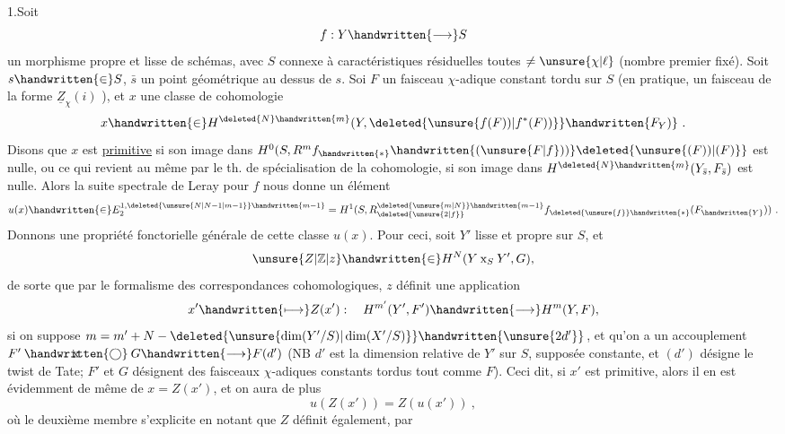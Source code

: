 
1.\quad Soit
\[
f:Y\handwritten{\longrightarrow}S
\]
un morphisme propre et lisse de schémas, avec $S$  connexe à caractéristiques résiduelles toutes $\ne\unsure{\chi|\ell}$ (nombre premier fixé). Soit $s\handwritten{\in}S$, $\bar s$ un point géométrique au dessus de $s$. Soi $F$ un faisceau $\chi$-adique constant tordu sur $S$ (en pratique, un faisceau de la forme $\underline{Z}_{\chi}(i)$ ), et $x$ une classe de cohomologie
\[
x\handwritten{\in}H^{\deleted{N}\handwritten{m}}(Y,\deleted{\unsure{f(F))|f^*(F))}}\handwritten{F_Y)}\ .
\]
Disons que $x$ est \uline{primitive} si son image dans $H^0(S,R^m f_{\handwritten{*}}\handwritten{(\unsure{F|f}))}\deleted{\unsure{(F))|(F)}}$ est nulle, ou ce qui revient au même par le th. de spécialisation de la cohomologie, si son image dans $H^{\deleted{N}\handwritten{m}}(Y_{\bar s},F_{\bar s})$ est nulle. Alors la suite spectrale de Leray pour $f$ nous donne un élément
\[
u(x)\handwritten{\in}E_2^{1,\deleted{\unsure{N|N-1|m-1}}\handwritten{m-1}}=H^1(S,R^{\deleted{\unsure{m|N}}\handwritten{m-1}}_{\deleted{\unsure{2|f}}}f_{\deleted{\unsure{f}}\handwritten{*}}(F_{\handwritten{Y}}))\ .
\]
Donnons une propriété fonctorielle générale de cette classe $u(x)$. Pour ceci, soit $Y'$ lisse et propre sur $S$, et
\[
\unsure{Z|\mathbb{Z}|z}\handwritten{\in}H^N(Y\mathbin{\mathrm{x}}_S Y',G),
\]
de sorte que par le formalisme des correspondances cohomologiques, $z$ définit une application
\[
x'\handwritten{\longmapsto}Z(x'): \quad H^{m'}(Y',F')\handwritten{\longrightarrow}H^m(Y,F),
\]
si on suppose $m=m'+N-\deleted{\unsure{\dim(Y'/S)|\dim(X'/S)}}\handwritten{\unsure{2d'}}$, et qu'on a un accouplement $F'\mathbin{\ooalign{\hfil$\mathrm{x}$\hfil\cr\hfil$\handwritten{\bigcirc}$\hfil\cr}}G\handwritten{\longrightarrow}F(d')$ (NB $d'$ est la dimension relative de $Y'$ sur $S$, supposée constante, et $(d')$ désigne le twist de Tate; $F'$ et $G$ désignent des faisceaux $\chi$-adiques constants tordus  tout comme $F$). Ceci dit, si $x'$ est primitive, alors il en est évidemment de même de $x=Z(x')$, et on aura de plus
\[
u(Z(x'))=Z(u(x'))\ ,
\]
où le deuxième membre s'explicite en notant que $Z$ définit également, par
